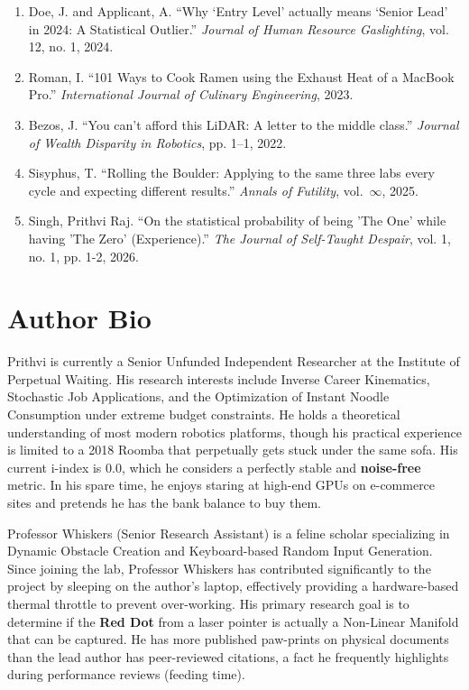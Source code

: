 \documentclass[letterpaper]{article}
\begin{document}
\begin{enumerate}
    \item Doe, J. and Applicant, A. ``Why `Entry Level' actually means `Senior Lead' in 2024: A Statistical Outlier.'' \textit{Journal of Human Resource Gaslighting}, vol. 12, no. 1, 2024.
    
    \item Roman, I. ``101 Ways to Cook Ramen using the Exhaust Heat of a MacBook Pro.'' \textit{International Journal of Culinary Engineering}, 2023.

    \item Bezos, J. ``You can't afford this LiDAR: A letter to the middle class.'' \textit{Journal of Wealth Disparity in Robotics}, pp. 1--1, 2022.
    
    \item Sisyphus, T. ``Rolling the Boulder: Applying to the same three labs every cycle and expecting different results.'' \textit{Annals of Futility}, vol.~$\infty$, 2025.

    \item Singh, Prithvi Raj. ``On the statistical probability of being 'The One' while having 'The Zero' (Experience).'' \textit{The Journal of Self-Taught Despair}, vol. 1, no. 1, pp. 1-2, 2026.
\end{enumerate}

\section{Author Bio}
Prithvi is currently a Senior Unfunded Independent Researcher at the Institute of Perpetual Waiting. His research interests include Inverse Career Kinematics, Stochastic Job Applications, and the Optimization of Instant Noodle Consumption under extreme budget constraints. He holds a theoretical understanding of most modern robotics platforms, though his practical experience is limited to a 2018 Roomba that perpetually gets stuck under the same sofa. His current i-index is $0.0$, which he considers a perfectly stable and \textbf{noise-free} metric. In his spare time, he enjoys staring at high-end GPUs on e-commerce sites and pretends he has the bank balance to buy them.

Professor Whiskers (Senior Research Assistant) is a feline scholar specializing in Dynamic Obstacle Creation and Keyboard-based Random Input Generation. Since joining the lab, Professor Whiskers has contributed significantly to the project by sleeping on the author’s laptop, effectively providing a hardware-based thermal throttle to prevent over-working. His primary research goal is to determine if the \textbf{Red Dot} from a laser pointer is actually a Non-Linear Manifold that can be captured. He has more published paw-prints on physical documents than the lead author has peer-reviewed citations, a fact he frequently highlights during performance reviews (feeding time).
\end{document}
